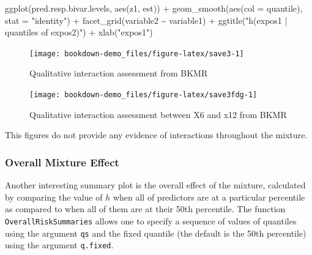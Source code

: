 \documentclass[
]{book}
\newenvironment{Shaded}{\begin{snugshade}}{\end{snugshade}}
\newcommand{\AttributeTok}[1]{\textcolor[rgb]{0.77,0.63,0.00}{#1}}
\newcommand{\FunctionTok}[1]{\textcolor[rgb]{0.00,0.00,0.00}{#1}}
\newcommand{\NormalTok}[1]{#1}
\newcommand{\SpecialCharTok}[1]{\textcolor[rgb]{0.00,0.00,0.00}{#1}}
\newcommand{\StringTok}[1]{\textcolor[rgb]{0.31,0.60,0.02}{#1}}
\begin{document}
\begin{Shaded}
\begin{Highlighting}[]
\FunctionTok{ggplot}\NormalTok{(pred.resp.bivar.levels, }\FunctionTok{aes}\NormalTok{(z1, est)) }\SpecialCharTok{+} 
  \FunctionTok{geom\_smooth}\NormalTok{(}\FunctionTok{aes}\NormalTok{(}\AttributeTok{col =}\NormalTok{ quantile), }\AttributeTok{stat =} \StringTok{"identity"}\NormalTok{) }\SpecialCharTok{+} 
 \FunctionTok{facet\_grid}\NormalTok{(variable2 }\SpecialCharTok{\textasciitilde{}}\NormalTok{ variable1) }\SpecialCharTok{+}
  \FunctionTok{ggtitle}\NormalTok{(}\StringTok{"h(expos1 | quantiles of expos2)"}\NormalTok{) }\SpecialCharTok{+}
 \FunctionTok{xlab}\NormalTok{(}\StringTok{"expos1"}\NormalTok{)}
\end{Highlighting}
\end{Shaded}

\begin{figure}[H]

{\centering \texttt{[image: bookdown-demo\_files/figure-latex/save3-1]} 

}

\caption{Qualitative interaction assessment from BKMR}\label{fig:save3}
\end{figure}

\begin{figure}[H]

{\centering \texttt{[image: bookdown-demo\_files/figure-latex/save3fdg-1]} 

}

\caption{Qualitative interaction assessment between X6 and x12 from BKMR}\label{fig:save3fdg}
\end{figure}

This figures do not provide any evidence of interactions throughout the mixture.

\hypertarget{overall-mixture-effect}{%
\subsubsection{Overall Mixture Effect}\label{overall-mixture-effect}}

Another interesting summary plot is the overall effect of the mixture, calculated by comparing the value of \(h\) when all of predictors are at a particular percentile as compared to when all of them are at their 50th percentile. The function \texttt{OverallRiskSummaries} allows one to specify a sequence of values of quantiles using the argument \texttt{qs} and the fixed quantile (the default is the 50th percentile) using the argument \texttt{q.fixed}.
\end{document}
